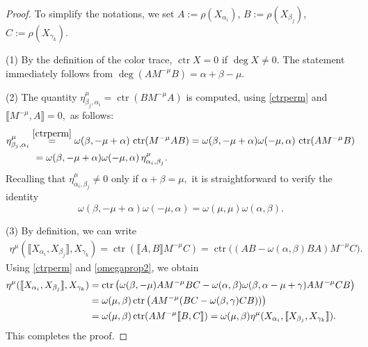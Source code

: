 \documentclass[10pt,a4paper]{amsart}
\numberwithin{equation}{section}
\theoremstyle{definition}
\def\nn{\notag}
\begin{document}
\begin{proof}
	To simplify the notations, we set $ A := \rho(X_{\alpha_i})$, $B := \rho(X_{\beta_j})$, $C := \rho(X_{\gamma_k})$.

(1) By the definition of the color trace, $\operatorname{ctr} X = 0 $ if $\deg X \neq 0.$
		The statement immediately follows from $ \deg (AM^{-\mu}B) = \alpha + \beta - \mu$.

(2) The quantity $\eta^{\mu}_{\beta_j,\alpha_i} = \operatorname{ctr}(B M^{-\mu} A) $ is computed, using \eqref{ctrperm} and $ \llbracket M^{-\mu}, A \rrbracket = 0, $ as follows:
		\begin{align*}
			\eta^{\mu}_{\beta_j,\alpha_i} &
			\stackrel{\eqref{ctrperm}}{=} \omega(\beta,-\mu+\alpha)\, \operatorname{ctr}(M^{-\mu} A B)
			= \omega(\beta,-\mu+\alpha) \omega(-\mu,\alpha)\, \operatorname{ctr}(A M^{-\mu} B)
			\nn \\
			&\, \, = \omega(\beta,-\mu+\alpha) \omega(-\mu,\alpha)\, \eta^{\mu}_{\alpha_i, \beta_j}.
		\end{align*}
		Recalling that $ \eta^{\mu}_{\alpha_i, \beta_j} \neq 0 $ only if $ \alpha+\beta = \mu,$
		it is straightforward to verify the identity
\[
\omega(\beta,-\mu+\alpha) \omega(-\mu,\alpha) = \omega(\mu,\mu) \omega(\alpha,\beta).
\]

(3) By definition, we can write
		\begin{align*}
			\eta^{\mu}(\llbracket X_{\alpha_i}, X_{\beta_j} \rrbracket, X_{\gamma_k} ) =
			\operatorname{ctr}(\llbracket A, B \rrbracket M^{-\mu}C)
			=\operatorname{ctr}\big( (AB - \omega(\alpha,\beta) BA) M^{-\mu}C \big).
		\end{align*}
		Using \eqref{ctrperm} and \eqref{omegaprop2}, we obtain
		\begin{align*}
			\eta^{\mu}(\llbracket X_{\alpha_i}, X_{\beta_j} \rrbracket, X_{\gamma_k} )
			&= \operatorname{ctr}\big( \omega(\beta,-\mu) A M^{-\mu} BC - \omega(\alpha,\beta) \omega(\beta,\alpha-\mu+\gamma) A M^{-\mu}CB \big)
			\nn \\
			&= \omega(\mu,\beta) \operatorname{ctr}\big( A M^{-\mu} (BC - \omega(\beta,\gamma) CB)) \big)
			\nn \\
			&= \omega(\mu,\beta) \operatorname{ctr} (A M^{-\mu} \llbracket B, C \rrbracket) = \omega(\mu,\beta) \eta^{\mu}(X_{\alpha_i}, \llbracket X_{\beta_j}, X_{\gamma_k} \rrbracket).
		\end{align*}
This completes the proof.
\end{proof}
\end{document}

